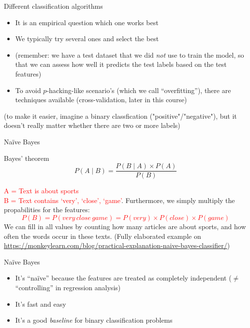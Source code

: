 \documentclass[compress]{beamer}
\begin{document}
\begin{frame}[plain]
\begin{columns}[]
		
	\end{columns}
	
\end{frame}





\begin{frame}{Different classification algorithms}

\begin{itemize}[<+->]
	\item It is an empirical question which one works best
	\item We typically try several ones and select the best
	\item (remember: we have a test dataset that we did \emph{not} use to train the model, so that we can assess how well it predicts the test labels based on the test features)
	\item To avoid $p$-hacking-like scenario's (which we call ``overfitting''), there are techniques available (cross-validation, later in this course)
\end{itemize}
(to make it easier, imagine a binary classfication ("positive"/"negative"), but it doesn't really matter whether there are two or more labels)
\end{frame}






\begin{frame}{Naïve Bayes}
	\begin{block}{Bayes' theorem}
		$$ P(A \mid B) = \frac{P(B \mid A) \times P(A)}{P(B)} $$
	\end{block}
	\pause
	\textcolor{red}{A = Text is about sports\\
		B = Text contains `very', `close', `game'}.
	\pause
	Furthermore, we simply multiply the propabilities for the features:
	\textcolor{red}{$$P(B) = P(very\, close\, game) = P(very) \times P(close) \times P(game)$$}
	We can fill in all values by counting how many articles are about sports, and how often the words occur in these texts.
	\vspace{0.3cm}
	\footnotesize{
		(Fully elaborated example on \url{https://monkeylearn.com/blog/practical-explanation-naive-bayes-classifier/})}
\end{frame}

\begin{frame}{Naïve Bayes}
	\begin{itemize}[<+->]
		\item It's ``naïve'' because the features are treated as completely independent ($\neq$ ``controlling'' in regression analysis)
		\item It's fast and easy
		\item It's a good \emph{baseline} for binary classification problems
	\end{itemize}
\end{frame}
\end{document}
